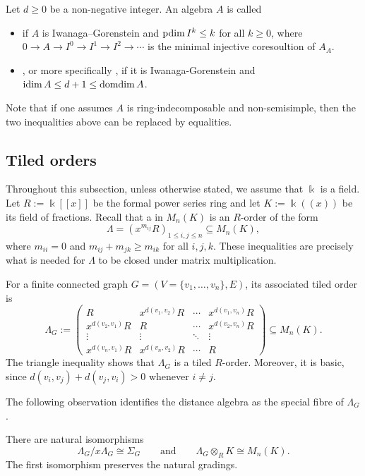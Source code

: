 \documentclass[a4paper,leqno]{amsart}
\begin{document}
Let $d\ge 0$ be a non-negative integer.
An algebra $A$ is called
\begin{itemize}
    \item {} if $A$ is Iwanaga--Gorenstein and $\operatorname{pdim} I^k\le k$ for all $k\ge 0$, where $0\to A\to I^0 \to I^1 \to I^2\to \cdots$ is the minimal injective coresoultion of $A_A$.

    \item {}, or more specifically , if it is Iwanaga-Gorenstein and $\operatorname{idim} A \le d+1\le \operatorname{domdim} A$.
\end{itemize}
Note that if one assumes $A$ is ring-indecomposable and non-semisimple, then the two inequalities above can be replaced by equalities.

\subsection{Tiled orders}\label{subsec:tiled-order}

Throughout this subsection, unless otherwise stated, we assume that $\Bbbk$ is a field.
Let $R:=\Bbbk[[x]]$ be the formal power series ring and let $K:=\Bbbk((x))$ be its field of fractions.  Recall that a
 in $M_n(K)$ is an $R$-order of the form
\[
\Lambda=(x^{m_{ij}}R)_{1\leq i,j\leq n}\subseteq M_n(K),
\]
where $m_{ii}=0$ and $m_{ij}+m_{jk}\geq m_{ik}$ for all $i,j,k$.  These inequalities are precisely what is needed for $\Lambda$ to be closed under matrix multiplication.

For a finite connected graph $G=(V=\{v_1,\ldots, v_n\},E)$, its associated tiled order is
\[
\Lambda_G
:=
\begin{pmatrix}
R & x^{d(v_1,v_2)}R & \cdots & x^{d(v_1,v_n)}R\\
x^{d(v_2,v_1)}R & R & \cdots & x^{d(v_2,v_n)}R\\
\vdots & \vdots & \ddots & \vdots\\
x^{d(v_n,v_1)}R & x^{d(v_n,v_2)}R & \cdots & R
\end{pmatrix}
\subseteq M_n(K).
\]
The triangle inequality shows that $\Lambda_G$ is a tiled $R$-order.
Moreover, it is basic, since $d(v_i,v_j)+d(v_j,v_i)>0$ whenever $i\neq j$.

The following observation identifies the distance algebra as the
special fibre of $\Lambda_G$.

\begin{prop}\label{prop:graph-metric-tiled-order}
There are natural isomorphisms
\[
\Lambda_G/x\Lambda_G\cong\Sigma_G
\qquad\text{and}\qquad
\Lambda_G\otimes_R K\cong M_n(K).
\]
The first isomorphism preserves the natural gradings.
\end{prop}
\end{document}
